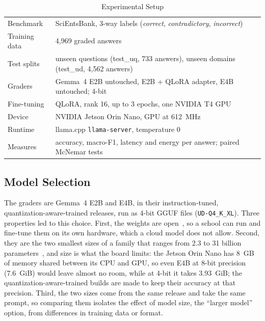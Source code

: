 \documentclass[journal]{IEEEtran}
\begin{document}
\begin{table}[!t]
\centering
\caption{Experimental Setup}
\label{tab:setup}
\footnotesize
\setlength{\tabcolsep}{3pt}
\begin{tabular}{@{}p{}p{}@{}}
\toprule
Benchmark & SciEntsBank, 3-way labels (\textit{correct}, \textit{contradictory}, \textit{incorrect}) \\
Training data & 4{,}969 graded answers \\
Test splits & unseen questions (test\_uq, 733 answers), unseen domains (test\_ud, 4{,}562 answers) \\
Graders & Gemma~4 E2B untouched, E2B + QLoRA adapter, E4B untouched; 4-bit \\
Fine-tuning & QLoRA, rank 16, up to 3 epochs, one NVIDIA T4 GPU \\
Device & NVIDIA Jetson Orin Nano, GPU at 612~MHz \\
Runtime & llama.cpp \texttt{llama-server}, temperature 0 \\
Measures & accuracy, macro-F1, latency and energy per answer; paired McNemar tests \\
\bottomrule
\end{tabular}
\end{table}

\subsection{Model Selection}
\label{sec:graders}
The graders are Gemma~4 E2B and E4B, in their instruction-tuned, quantization-aware-trained releases, run as 4-bit GGUF files (\texttt{UD-Q4\_K\_XL}).
Three properties led to this choice.
First, the weights are open~\cite{gemma2026gemma4}, so a school can run and fine-tune them on its own hardware, which a cloud model does not allow.
Second, they are the two smallest sizes of a family that ranges from 2.3 to 31 billion parameters~\cite{gemma2026gemma4}, and size is what the board limits: the Jetson Orin Nano has 8~GB of memory shared between its CPU and GPU, so even E4B at 8-bit precision (7.6~GiB) would leave almost no room, while at 4-bit it takes 3.93~GiB; the quantization-aware-trained builds are made to keep their accuracy at that precision.
Third, the two sizes come from the same release and take the same prompt, so comparing them isolates the effect of model size, the ``larger model'' option, from differences in training data or format.
\end{document}
